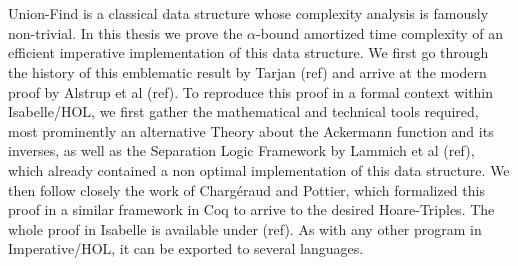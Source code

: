 \chapter{\abstractname}

Union-Find is a classical data structure whose complexity analysis is famously non-trivial. In this thesis we prove the $\alpha$-bound amortized time complexity of an efficient imperative implementation of this data structure. We first go through the history of this emblematic result by Tarjan (ref) and arrive at the modern proof by Alstrup et al (ref). 
To reproduce this proof in a formal context within Isabelle/HOL, we first gather the mathematical and technical tools required, most prominently an alternative Theory about the Ackermann function and its inverses, as well as the Separation Logic Framework by Lammich et al (ref), which already contained a non optimal implementation of this data structure.
We then follow closely the work of Chargéraud and Pottier, which formalized this proof in a similar framework in Coq to arrive to the desired Hoare-Triples. The whole proof in Isabelle is available under (ref). As with any other program in Imperative/HOL, it can be exported to several languages.

